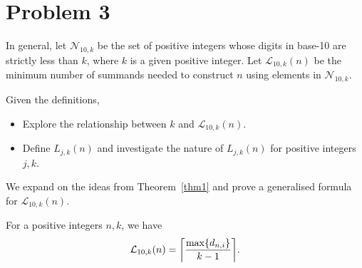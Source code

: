 \section{Problem 3}
In general, let  $\mathcal{N}_{10, k}$ be the set of positive integers whose digits in base-10 are strictly less than $k$, where $k$ is a given positive integer. Let $\mathcal{L}_{10,k}(n)$ be the minimum number of summands needed to construct $n$ using elements in $\mathcal{N}_{10,k}$.
\begin{problem}
  Given the definitions, 
  \begin{itemize}
    \item Explore the relationship between $k$ and $\mathcal{L}_{10, k}(n)$.
    \item Define $L_{j, k}(n)$ and investigate the nature of $L_{j, k}(n)$ for positive integers $j, k$.
  \end{itemize}
\end{problem}
We expand on the ideas from Theorem~\ref{thm1} and prove a generalised formula for $\mathcal{L}_{10, k}(n).$
\begin{theorem} \label{thm:max}
  For a positive integers $n, k$, we have \[\mathcal{L}_{10, k}(n) = \ceil*{\frac{\max\{d_{n, i}\}}{k-1}}.\]
\end{theorem}
